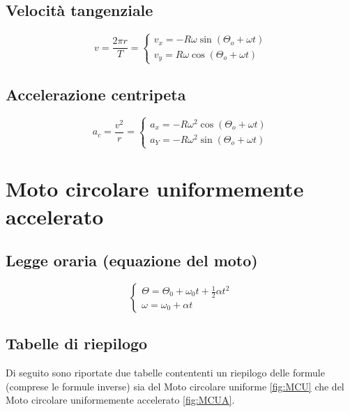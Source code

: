         \subsection*{Velocità tangenziale}
            \begin{equation*}
                v = \frac{2\pi r}{T} = 
                \begin{cases}
                    v_x=-R\omega\sin{(\Theta_o+\omega t)} \\
                    v_y=R\omega\cos{(\Theta_o+\omega t)}
                \end{cases}
            \end{equation*}

        \subsection*{Accelerazione centripeta} 
            \begin{equation*}
                a_c = \frac{v^2}{r}=
                \begin{cases}
                    a_x=-R\omega^2\cos{(\Theta_o+\omega t)} \\
                    a_Y=-R\omega^2\sin{(\Theta_o+\omega t)}\end{cases}
            \end{equation*}
        
    \section*{Moto circolare uniformemente accelerato}

        \subsection*{Legge oraria (equazione del moto)}
            \begin{equation*}
                \begin{cases} 
                    \Theta = \Theta_0 + \omega_0t + \frac{1}{2}\alpha t^2 \\ 
                    \omega = \omega_0+\alpha t
                \end{cases}
            \end{equation*}

        \subsection*{Tabelle di riepilogo} Di seguito sono riportate due 
        tabelle contententi un riepilogo delle formule (comprese le formule 
        inverse) sia del Moto circolare uniforme \ref{fig:MCU} che del Moto 
        circolare uniformemente accelerato \ref{fig:MCUA}.

